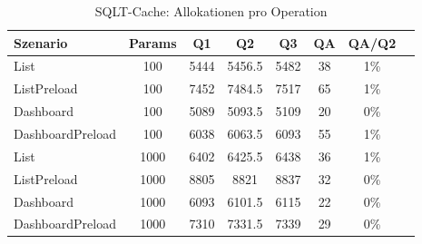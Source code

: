 \begin{table}[ht]
\centering
\caption{SQLT-Cache: Allokationen pro Operation}
\begin{tabular}{lccccccc}
\toprule
Szenario & Params & Q1 & Q2 & Q3 & QA & QA/Q2 \\
\midrule
	List & 100 & 5444 & 5456.5 & 5482 & 38 & 1\% \\
	ListPreload & 100 & 7452 & 7484.5 & 7517 & 65 & 1\% \\
	Dashboard & 100 & 5089 & 5093.5 & 5109 & 20 & 0\% \\
	DashboardPreload & 100 & 6038 & 6063.5 & 6093 & 55 & 1\% \\
	List & 1000 & 6402 & 6425.5 & 6438 & 36 & 1\% \\
	ListPreload & 1000 & 8805 & 8821 & 8837 & 32 & 0\% \\
	Dashboard & 1000 & 6093 & 6101.5 & 6115 & 22 & 0\% \\
	DashboardPreload & 1000 & 7310 & 7331.5 & 7339 & 29 & 0\% \\
\bottomrule
\end{tabular}
\label{tab:benchmark_sqlt-cache_allocsperop}
\end{table}
	